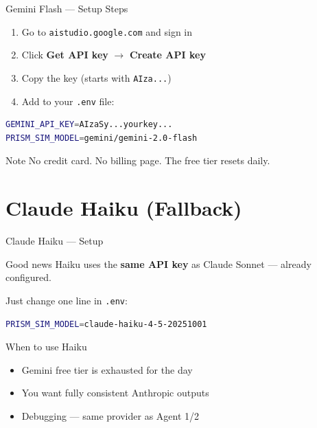 \documentclass{beamer}
\begin{document}
\begin{frame}[fragile]{Gemini Flash — Setup Steps}
  \begin{enumerate}
    \item Go to \texttt{aistudio.google.com} and sign in
    \pause
    \item Click \textbf{Get API key} $\rightarrow$ \textbf{Create API key}
    \pause
    \item Copy the key (starts with \texttt{AIza...})
    \pause
    \item Add to your \texttt{.env} file:
  \end{enumerate}
  \vspace{6pt}
\begin{lstlisting}[language=bash]
GEMINI_API_KEY=AIzaSy...yourkey...
PRISM_SIM_MODEL=gemini/gemini-2.0-flash
\end{lstlisting}
  \vspace{6pt}
  \begin{exampleblock}{Note}
    No credit card. No billing page. The free tier resets daily.
  \end{exampleblock}
\end{frame}

\section{Claude Haiku (Fallback)}

\begin{frame}[fragile]{Claude Haiku — Setup}
  \begin{alertblock}{Good news}
    Haiku uses the \textbf{same API key} as Claude Sonnet — already configured.
  \end{alertblock}
  \vspace{10pt}
  Just change one line in \texttt{.env}:
\begin{lstlisting}[language=bash]
PRISM_SIM_MODEL=claude-haiku-4-5-20251001
\end{lstlisting}
  \vspace{10pt}
  \begin{block}{When to use Haiku}
    \begin{itemize}
      \item Gemini free tier is exhausted for the day
      \item You want fully consistent Anthropic outputs
      \item Debugging — same provider as Agent 1/2
    \end{itemize}
  \end{block}
\end{frame}
\end{document}
